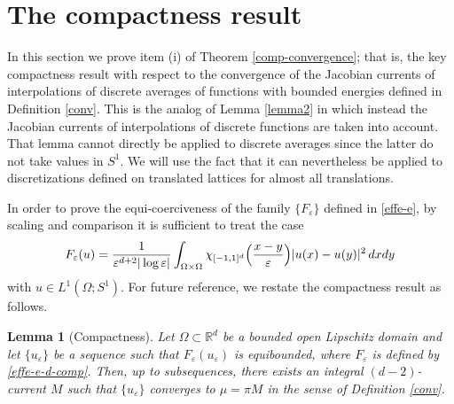 \documentclass[11pt]{article}
\newtheorem{lemma}[definition]{Lemma}
\def\e{\varepsilon}
\def\dxy{\,dx dy}
\begin{document}
\section{The compactness result}\label{comp-sec}
In this section we prove item (i) of Theorem \ref{comp-convergence}; that is, the key compactness result with respect to the convergence of the Jacobian currents of interpolations of discrete averages of functions with bounded energies defined in Definition \ref{conv}. This is the analog of Lemma \ref{lemma2} in which instead the Jacobian currents of interpolations of discrete functions are taken into account. That lemma cannot directly be applied to discrete averages since the latter do not take values in $S^1$. We will use the fact that it can nevertheless be applied to discretizations defined on  translated lattices for almost all translations. 


In order to prove the equi-coerciveness of the family $\{F_\e\}$ defined in \eqref{effe-e}, 
by scaling and comparison it is sufficient to treat the case 
\begin{equation}\label{effe-e-d-comp}
F_\e(u)={1\over\e^{d+2}|\log\e|} \int_{\Omega\times\Omega}\chi_{[-1,1]^d}\Bigl({x-y\over\e}\Bigr) {|u(x)-u(y)|^2}\dxy 
\end{equation}
with $u\in L^1(\Omega; S^1)$. 
For future reference, we restate the compactness result as follows. 
\begin{lemma}[Compactness]\label{compactness}
Let $\Omega\subset \mathbb R^d$ be a bounded open Lipschitz domain and let 
$\{u_\e\}$ be a sequence such that 
$F_\e(u_\e)$ is equibounded, where $F_\e$ is defined by
\eqref{effe-e-d-comp}. 
Then, up to subsequences, there exists an integral $(d-2)$-current $M$ 
such that $\{u_\e\}$ converges to $\mu=\pi M$ in the sense of Definition {\rm\ref{conv}}. 
\end{lemma}
\end{document}
